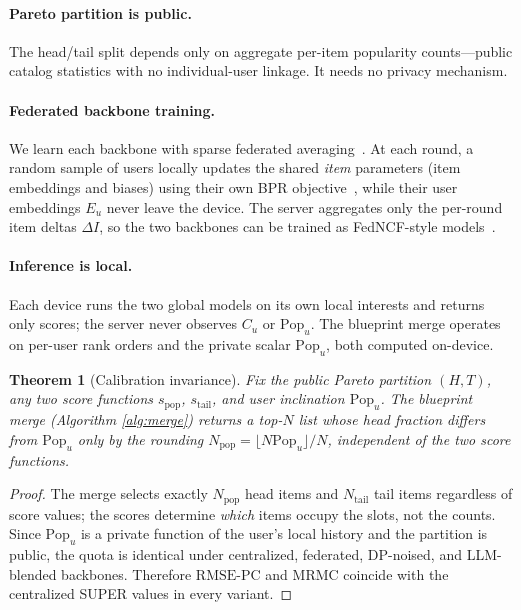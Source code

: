\documentclass{article}
\newcommand{\Pop}{\mathrm{Pop}}
\newcommand{\RMSEPC}{\mathrm{RMSE\text{-}PC}}
\newcommand{\MRMC}{\mathrm{MRMC}}
\newtheorem{theorem}{Theorem}
\begin{document}
\paragraph{Pareto partition is public.}
The head/tail split depends only on aggregate per-item popularity counts---public catalog
statistics with no individual-user linkage. It needs no privacy mechanism.

\paragraph{Federated backbone training.}
We learn each backbone with sparse federated averaging~\cite{mcmahan2017fedavg}. At each round, a
random sample of users locally updates the shared \emph{item} parameters (item embeddings and
biases) using their own BPR objective~\cite{rendle2009bpr}, while their user embeddings
\(E_u\) never leave the device. The server aggregates only the per-round item deltas \(\Delta I\),
so the two backbones can be trained as FedNCF-style models~\cite{he2017ncf}.

\paragraph{Inference is local.}
Each device runs the two global models on its own local interests and returns only scores; the
server never observes \(C_u\) or \(\Pop_u\). The blueprint merge operates on per-user rank orders
and the private scalar \(\Pop_u\), both computed on-device.

\begin{theorem}[Calibration invariance]
\label{prop:invariance}
Fix the public Pareto partition \((H,T)\), any two score functions \(s_{\mathrm{pop}}\),
\(s_{\mathrm{tail}}\), and user inclination \(\Pop_u\). The blueprint merge (Algorithm
\ref{alg:merge}) returns a top-\(N\) list whose head fraction differs from \(\Pop_u\) only by the
rounding \(N_{\mathrm{pop}}=\lfloor N\Pop_u\rfloor/N\), independent of the two score functions.
\end{theorem}

\begin{proof}
The merge selects exactly \(N_{\mathrm{pop}}\) head items and \(N_{\mathrm{tail}}\) tail items
regardless of score values; the scores determine \emph{which} items occupy the slots, not the
counts. Since \(\Pop_u\) is a private function of the user's local history and the partition is
public, the quota is identical under centralized, federated, DP-noised, and LLM-blended backbones.
Therefore \(\RMSEPC\) and \(\MRMC\) coincide with the centralized SUPER values in every variant.
\end{proof}
\end{document}
